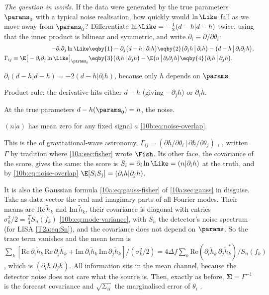 \emph{The question in words.} If the data were generated by the true parameters $\params_0$ with a typical noise
realisation, how quickly would $\ln\Like$ fall as we move away from $\params_0$? Differentiate
$\ln\Like=-\tfrac12(d-h|d-h)$ twice, using that the inner product is bilinear and symmetric, and write
$\partial_i\equiv\partial/\partial\theta_i$:
\begin{align}
  -\partial_i\partial_j\ln\Like
  &\eqby{1}-\partial_j\big(d-h\,\big|\,\partial_ih\big)
   \eqby{2}\big(\partial_jh\,\big|\,\partial_ih\big)-\big(d-h\,\big|\,\partial_i\partial_jh\big),\nonumber\\
  \Gamma_{ij}\equiv\E\big[-\partial_i\partial_j\ln\Like\big]_{\params_0}
  &\eqby{3}\big(\partial_ih\,\big|\,\partial_jh\big)-\E\big(n\,\big|\,\partial_i\partial_jh\big)
   \eqby{4}\big(\partial_ih\,\big|\,\partial_jh\big).
  \label{10b:eq:gw-fisher}
\end{align}
\begin{explain}
  \item $\partial_i(d-h|d-h)=-2(d-h|\partial_ih)$, because only $h$ depends on $\params$.
  \item Product rule: the derivative hits either $d-h$ (giving $-\partial_jh$) or $\partial_ih$.
  \item At the true parameters $d-h(\params_0)=n$, the noise.
  \item $(n|a)$ has mean zero for any fixed signal $a$ \eqref{10b:eq:noise-overlap}.
\end{explain}
This is the  of gravitational-wave astronomy,
$\Gamma_{ij}=(\partial h/\partial\theta_i\,|\,\partial h/\partial\theta_j)$ \cite[eq.~(10)]{CutlerFlanagan1994},
\cite[eq.~(41)]{BarackCutler2004}, written $\Gamma$ by tradition where \cref{10a:sec:fisher} wrote $\Fish$. Its other
face, the covariance of the score, gives the same: the score is $S_i=\partial_i\ln\Like=(n|\partial_ih)$ at the
truth, and by \eqref{10b:eq:noise-overlap} $\E[S_iS_j]=(\partial_ih|\partial_jh)$.

It is also the Gaussian formula \eqref{10a:eq:gauss-fisher} of \cref{10a:sec:gauss} in disguise. Take as data
vector the real and imaginary parts of all Fourier modes. Their means are $\mathrm{Re}\,\tilde h_k$ and
$\mathrm{Im}\,\tilde h_k$, their covariance is diagonal with entries $\sigma_k^2/2=\tfrac T4S_n(f_k)$ \eqref{10b:eq:mode-variance}, with $S_n$ the
detector's noise spectrum (for LISA \cref{T2a:eq:Sn}), and the
covariance does not depend on $\params$. So the trace term vanishes and the mean term is
$\sum_k[\mathrm{Re}\,\partial_i\tilde h_k\,\mathrm{Re}\,\partial_j\tilde h_k+\mathrm{Im}\,\partial_i\tilde h_k\,
\mathrm{Im}\,\partial_j\tilde h_k]/(\sigma_k^2/2)=4\Delta f\sum_k\mathrm{Re}(\partial_i\tilde h_k\,\partial_j\tilde h_k^*)
/S_n(f_k)$, which is $(\partial_ih|\partial_jh)$. All information sits in the mean channel, because the detector noise
does not care what the source is. Then, exactly as before, $\bm\Sigma=\Gamma^{-1}$ is the forecast covariance and
$\sqrt{\Sigma_{ii}}$ the marginalised error of $\theta_i$ \cite[eq.~(11)]{CutlerFlanagan1994}.

